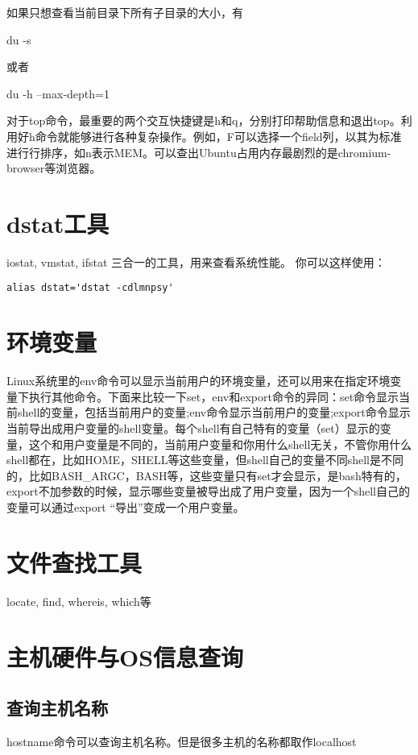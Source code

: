 如果只想查看当前目录下所有子目录的大小，有
\begin{shellcmd}
du -s
\end{shellcmd}
或者
\begin{shellcmd}
du -h --max-depth=1
\end{shellcmd}

对于top命令，最重要的两个交互快捷键是h和q，分别打印帮助信息和退出top。利用好h命令就能够进行各种复杂操作。例如，F可以选择一个field列，以其为标准进行行排序，如n表示MEM。可以查出Ubuntu占用内存最剧烈的是chromium-browser等浏览器。
 




\section{dstat工具}
iostat, vmstat, ifstat 三合一的工具，用来查看系统性能。
你可以这样使用：

\begin{verbatim}
alias dstat='dstat -cdlmnpsy'
\end{verbatim}


\section{环境变量}
Linux系统里的env命令可以显示当前用户的环境变量，还可以用来在指定环境变量下执行其他命令。下面来比较一下set，env和export命令的异同：set命令显示当前shell的变量，包括当前用户的变量;env命令显示当前用户的变量;export命令显示当前导出成用户变量的shell变量。每个shell有自己特有的变量（set）显示的变量，这个和用户变量是不同的，当前用户变量和你用什么shell无关，不管你用什么shell都在，比如HOME，SHELL等这些变量，但shell自己的变量不同shell是不同的，比如BASH\_ARGC，BASH等，这些变量只有set才会显示，是bash特有的，export不加参数的时候，显示哪些变量被导出成了用户变量，因为一个shell自己的变量可以通过export “导出”变成一个用户变量。

\section{文件查找工具}
locate, find, whereis, which等
\section{主机硬件与OS信息查询}
\subsection*{查询主机名称}
hostname命令可以查询主机名称。但是很多主机的名称都取作localhost
